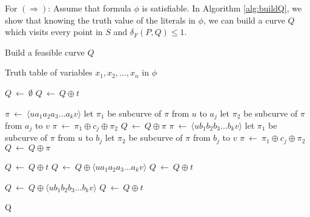 \documentclass[12pt]{dalthesis}
\def\favoritefont{\bfseries \sffamily}
\def\QED{\ensuremath{{\Box}}}
\def\markatright#1{\leavevmode\unskip\nobreak\quad\hspace*{\fill}{#1}}
\newenvironment{proof}
	{\begin{trivlist}\item[\hskip\labelsep{\favoritefont Proof:}]}
	{\markatright{\QED}\end{trivlist}}
\newcommand{\eq}{{\ \leftarrow\ }}
\newcommand{\distF}{\delta_F}
\newcommand{\pset}{S}
\newcommand{\ap}{\oplus}
\begin{document}
\begin{proof}



For $(\Rightarrow)$: 
Assume that  formula $\phi$ is satisfiable. 
In Algorithm \ref{alg:buildQ}, we show that 
knowing the truth value of the literals in $\phi$, 
we can build a curve $Q$ which 
visits every point in $\pset$ and $\distF(P,Q) \le 1$.



\begin{algorithm} [h]
\caption {{\sc Build a feasible curve $Q$ }} 
\label{alg:buildQ}
\begin{algorithmic}[1]	
		\baselineskip
	\REQUIRE  Truth table of variables $x_1, x_2, \dots, x_n$ in $\phi$

	\STATE $Q \eq \emptyset$
	\STATE $Q \eq Q \ap t$ \label{l:startPoint}
	 
	\STATE $\pi \eq \langle ua_1a_2a_3 \dots a_kv \rangle$
	\STATE let $\pi_1 $ be  subcurve of $\pi$ from $u$	 to $a_j$
	\STATE let $\pi_2 $ be  subcurve of $\pi$ from $a_j$	 to $v$
	\STATE $\pi \eq \pi_1 \ap c_j \ap \pi_2$  \label{l:visitCone}
	\ENDFOR
	\STATE $Q \eq Q \ap \pi$ \label{l:x1}
	\ELSE 	
	\STATE $\pi \eq \langle ub_1b_2b_3 \dots b_kv \rangle$
	\STATE let $\pi_1 $ be  subcurve of $\pi$ from $u$	 to $b_j$
	\STATE let $\pi_2 $ be  subcurve of $\pi$ from $b_j$	 to $v$
	\STATE $\pi \eq \pi_1 \ap c_j \ap \pi_2$ \label{l:visitCzero}
	\ENDFOR
	\STATE $Q \eq Q \ap \pi$ \label{l:x0}

	\ENDIF
	\STATE $Q \eq Q \ap t$
\ENDFOR
	\STATE $Q \eq Q \ap \langle ua_1a_2a_3 \dots a_kv \rangle$\label{l:nplusone}
	\STATE $Q \eq Q \ap t$

	\STATE $Q \eq Q \ap \langle ub_1b_2b_3 \dots b_kv \rangle$\label{l:nplustwo}
	\STATE $Q \eq Q \ap t$  \label{l:endPoint}

	 {\sc Q}  
\end{algorithmic}
\end{algorithm}








\end{proof}
\end{document}
